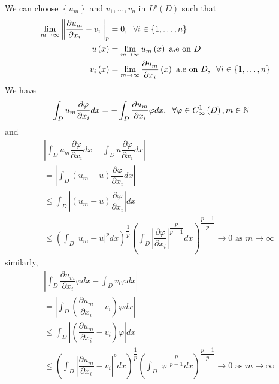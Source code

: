 \documentclass[a4paper]{article}
\numberwithin{equation}{section}
\begin{document}
We can choose $\left\{ {{u_m}} \right\}$ and $v_1,\ldots,v_n$ in $L^p\left(D\right)$ such that
\begin{align}
\mathop {\lim }\limits_{m \to \infty } {\left\| {\dfrac{{\partial {u_m}}}{{\partial {x_i}}} - {v_i}} \right\|_p} &= 0,\hspace{0.2cm}\forall i \in \left\{ {1, \ldots ,n} \right\}\\
u\left( x \right) &= \mathop {\lim }\limits_{m \to \infty } {u_m}\left( x \right)\mbox{ a.e on } D\\
{v_i}\left( x \right) &= \mathop {\lim }\limits_{m \to \infty } \dfrac{{\partial {u_m}}}{{\partial {x_i}}}\left( x \right)\mbox{ a.e on } D,\hspace{0.2cm}\forall i \in \left\{ {1, \ldots ,n} \right\}
\end{align}
We have
\begin{align}
\label{1.21}
\int_D {{u_m}\dfrac{{\partial \varphi }}{{\partial {x_i}}}dx}  &=  - \int_D {\dfrac{{\partial {u_m}}}{{\partial {x_i}}}\varphi dx} ,\hspace{0.2cm}\forall \varphi  \in C_\infty ^1\left( D \right),m \in \mathbb{N}
\end{align}
and
\begin{align}
&\left| {\int_D {{u_m}\dfrac{{\partial \varphi }}{{\partial {x_i}}}dx}  - \int_D {u\dfrac{{\partial \varphi }}{{\partial {x_i}}}dx} } \right| \\
&= \left| {\int_D {\left( {{u_m} - u} \right)\dfrac{{\partial \varphi }}{{\partial {x_i}}}dx} } \right|\\
 &\le \int_D {\left| {\left( {{u_m} - u} \right)\dfrac{{\partial \varphi }}{{\partial {x_i}}}} \right|dx} \\
 &\le {\left( {\int_D {{{\left| {{u_m} - u} \right|}^p}dx} } \right)^{\dfrac{1}{p}}}{\left( {\int_D {{{\left| {\dfrac{{\partial \varphi }}{{\partial {x_i}}}} \right|}^{\dfrac{p}{{p - 1}}}}dx} } \right)^{\dfrac{{p - 1}}{p}}} \to 0 \mbox{ as } m \to \infty \label{1.25}
\end{align}
similarly,
\begin{align}
&\left| {\int_D {\dfrac{{\partial {u_m}}}{{\partial {x_i}}}\varphi dx}  - \int_D {{v_i}\varphi dx} } \right|\\
 &= \left| {\int_D {\left( {\dfrac{{\partial {u_m}}}{{\partial {x_i}}} - {v_i}} \right)\varphi dx} } \right|\\
& \le \int_D {\left| {\left( {\dfrac{{\partial {u_m}}}{{\partial {x_i}}} - {v_i}} \right)\varphi } \right|dx} \\
& \le {\left( {\int_D {{{\left| {\dfrac{{\partial {u_m}}}{{\partial {x_i}}} - {v_i}} \right|}^p}dx} } \right)^{\dfrac{1}{p}}}{\left( {\int_D {{{\left| \varphi  \right|}^{\dfrac{p}{{p - 1}}}}dx} } \right)^{\dfrac{{p - 1}}{p}}} \to 0 \mbox{ as } m \to \infty \label{1.29}
\end{align}
\end{document}
